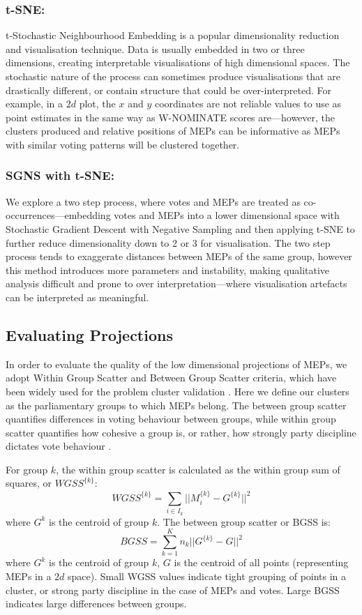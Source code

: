 \documentclass{llncs}
\newcommand{\clust}[2][k]{#2^{\{#1\}}}
\begin{document}
\subsubsection{t-SNE:}
t-Stochastic Neighbourhood Embedding is a popular dimensionality reduction and visualisation technique. Data is usually embedded in two or three dimensions, creating interpretable visualisations of high dimensional spaces. The stochastic nature of the process can sometimes produce visualisations that are drastically different, or contain structure that could be over-interpreted. For example, in a $2d$ plot, the $x$ and $y$ coordinates are not reliable values to use as point estimates in the same way as W-NOMINATE scores are---however, the clusters produced and relative positions of MEPs can be informative as MEPs with similar voting patterns will be clustered together. 

\subsubsection{SGNS with t-SNE:}
We explore a two step process, where votes and MEPs are treated as co-occurrences---embedding votes and MEPs into a lower dimensional space with Stochastic Gradient Descent with Negative Sampling \cite{levy2014neural} and then applying t-SNE to further reduce dimensionality down to 2 or 3 for visualisation.  The two step process tends to exaggerate distances between MEPs of the same group, however this method introduces more parameters and instability, making qualitative analysis difficult and prone to over interpretation---where visualisation artefacts can be interpreted as meaningful.

\subsection{Evaluating Projections}
In order to evaluate the quality of the low dimensional projections of MEPs, we adopt Within Group Scatter and Between Group Scatter criteria, which have been widely used for the problem cluster validation \cite{desgraupes2013clustering}. Here we define our clusters as the parliamentary groups to which MEPs belong. The between group scatter quantifies differences in voting behaviour between groups, while within group scatter quantifies how cohesive a group is, or rather, how strongly party discipline dictates vote behaviour \cite{Hix821}. 

For group $k$, the within group scatter is calculated as the within group sum of squares, or $\clust{WGSS}$:
$$
\clust{WGSS} = \sum_{i\in I_{k}} ||\clust{M}_{i}-\clust{G}||^2
$$
where $G^k$ is the centroid of group $k$. The between group scatter or BGSS is:
$$
BGSS=\sum_{k=1}^K n_{k}||\clust{G}-G||^2
$$
where $G^k$ is the centroid of group $k$, $G$ is the centroid of all points (representing MEPs in a $2d$ space). Small WGSS values indicate tight grouping of points in a cluster, or strong party discipline in the case of MEPs and votes. Large BGSS indicates large differences between groups.
\end{document}
